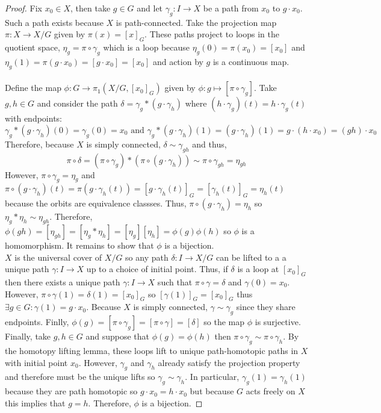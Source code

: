 \documentclass[12pt]{article}
\theoremstyle{remark}
\theoremstyle{definition}
\begin{document}
\begin{proof}
Fix $x_0 \in X$, then take $g \in G$ and let $\gamma_g : I \to X$ be a path from $x_0$ to $g \cdot x_0$. Such a path exists because $X$ is path-connected. Take the projection map $\pi : X \to X/G$ given by $\pi(x) = [x]_G$. These paths project to loops in the quotient space, $\eta_g = \pi \circ \gamma_g$ which is a loop because $\eta_g(0) = \pi(x_0) = [x_0]$ and $\eta_g(1) = \pi(g \cdot x_0) = [g \cdot x_0] = [x_0]$ and action by $g$ is a continuous map. \\\\
Define the map $\phi : G \to \pi_1(X/G, [x_0]_G)$ given by $\phi : g \mapsto [\pi \circ \gamma_g]$. Take $g, h \in G$ and consider the path $\delta = \gamma_g * (g \cdot \gamma_h)$  where $(h \cdot \gamma_g)(t) = h \cdot \gamma_g(t)$ with endpoints:
\[\gamma_g * (g \cdot \gamma_h)(0) = \gamma_g(0) = x_0 \text{ and } \gamma_g * (g \cdot \gamma_h)(1) = (g \cdot \gamma_h)(1) = g \cdot (h \cdot x_0) = (gh) \cdot x_0\]
Therefore, because $X$ is simply connected, $\delta \sim \gamma_{gh}$ and thus, 
\[\pi \circ \delta = (\pi \circ \gamma_g) * (\pi \circ (g \cdot \gamma_h)) \sim \pi \circ \gamma_{gh} = \eta_{gh}\]
However, $\pi \circ \gamma_g = \eta_g$ and $\pi \circ (g \cdot \gamma_h)(t) = \pi(g \cdot \gamma_h(t)) = [g \cdot \gamma_h(t)]_G = [\gamma_h(t)]_G = \eta_h(t)$ because the orbits are equivalence classses. Thus, $\pi \circ (g \cdot \gamma_h) = \eta_h$ so $\eta_g * \eta_h \sim \eta_{gh}$. 
Therefore, $\phi(gh) = [\eta_{gh}] = [\eta_g * \eta_h] = [\eta_g] [\eta_h] = \phi(g) \phi(h)$ so $\phi$ is a homomorphism. It remains to show that $\phi$ is a bijection. \bigskip \\
$X$ is the universal cover of $X/G$ so any path $\delta : I \to X/G$ can be lifted to a a unique path $\gamma : I \to X$ up to a choice of initial point. Thus, if $\delta$ is a loop at $[x_0]_G$ then there exists a unique path $\gamma : I \to X$ such that $\pi \circ \gamma = \delta$ and $\gamma(0) = x_0$. However, $\pi \circ \gamma(1) = \delta(1) = [x_0]_G$ so $[\gamma(1)]_G = [x_0]_G$ thus $\exists g \in G : \gamma(1) = g \cdot x_0$. Because $X$ is simply connected, $\gamma \sim \gamma_g$ since they share endpoints. Finlly, $\phi(g) = [\pi \circ \gamma_g] = [\pi \circ \gamma] = [\delta]$ so the map $\phi$ is surjective. Finally, take $g, h \in G$ and suppose that $\phi(g) = \phi(h)$ then $\pi \circ \gamma_g \sim \pi \circ \gamma_h$. By the homotopy lifting lemma, these loops lift to unique path-homotopic paths in $X$ with initial point $x_0$. However, $\gamma_g$ and $\gamma_h$ already satisfy the projection property and therefore must be the unique lifts so $\gamma_g \sim \gamma_h$. In particular, $\gamma_g(1) = \gamma_h(1)$ because they are path homotopic so $g \cdot x_0 = h \cdot x_0$ but because $G$ acts freely on $X$ this implies that $g = h$. Therefore, $\phi$ is a bijection.      
\end{proof}
\end{document}
